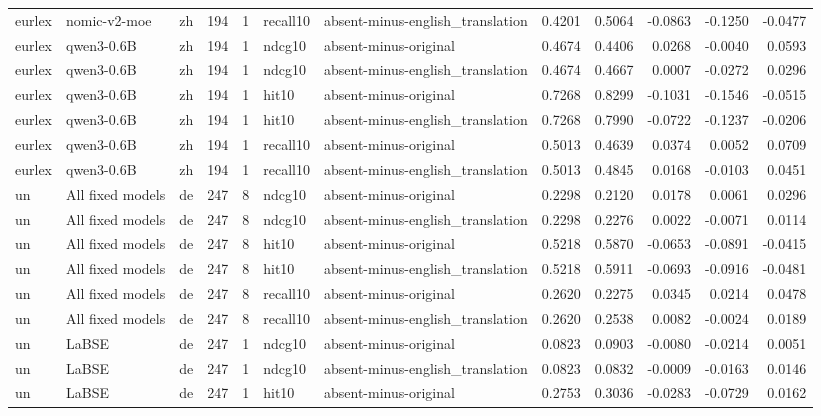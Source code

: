 \begin{tabular}{lllrrllrrrrr}
eurlex & nomic-v2-moe & zh & 194 & 1 & recall10 & absent-minus-english\_translation & 0.4201 & 0.5064 & -0.0863 & -0.1250 & -0.0477 \\
eurlex & qwen3-0.6B & zh & 194 & 1 & ndcg10 & absent-minus-original & 0.4674 & 0.4406 & 0.0268 & -0.0040 & 0.0593 \\
eurlex & qwen3-0.6B & zh & 194 & 1 & ndcg10 & absent-minus-english\_translation & 0.4674 & 0.4667 & 0.0007 & -0.0272 & 0.0296 \\
eurlex & qwen3-0.6B & zh & 194 & 1 & hit10 & absent-minus-original & 0.7268 & 0.8299 & -0.1031 & -0.1546 & -0.0515 \\
eurlex & qwen3-0.6B & zh & 194 & 1 & hit10 & absent-minus-english\_translation & 0.7268 & 0.7990 & -0.0722 & -0.1237 & -0.0206 \\
eurlex & qwen3-0.6B & zh & 194 & 1 & recall10 & absent-minus-original & 0.5013 & 0.4639 & 0.0374 & 0.0052 & 0.0709 \\
eurlex & qwen3-0.6B & zh & 194 & 1 & recall10 & absent-minus-english\_translation & 0.5013 & 0.4845 & 0.0168 & -0.0103 & 0.0451 \\
un & All fixed models & de & 247 & 8 & ndcg10 & absent-minus-original & 0.2298 & 0.2120 & 0.0178 & 0.0061 & 0.0296 \\
un & All fixed models & de & 247 & 8 & ndcg10 & absent-minus-english\_translation & 0.2298 & 0.2276 & 0.0022 & -0.0071 & 0.0114 \\
un & All fixed models & de & 247 & 8 & hit10 & absent-minus-original & 0.5218 & 0.5870 & -0.0653 & -0.0891 & -0.0415 \\
un & All fixed models & de & 247 & 8 & hit10 & absent-minus-english\_translation & 0.5218 & 0.5911 & -0.0693 & -0.0916 & -0.0481 \\
un & All fixed models & de & 247 & 8 & recall10 & absent-minus-original & 0.2620 & 0.2275 & 0.0345 & 0.0214 & 0.0478 \\
un & All fixed models & de & 247 & 8 & recall10 & absent-minus-english\_translation & 0.2620 & 0.2538 & 0.0082 & -0.0024 & 0.0189 \\
un & LaBSE & de & 247 & 1 & ndcg10 & absent-minus-original & 0.0823 & 0.0903 & -0.0080 & -0.0214 & 0.0051 \\
un & LaBSE & de & 247 & 1 & ndcg10 & absent-minus-english\_translation & 0.0823 & 0.0832 & -0.0009 & -0.0163 & 0.0146 \\
un & LaBSE & de & 247 & 1 & hit10 & absent-minus-original & 0.2753 & 0.3036 & -0.0283 & -0.0729 & 0.0162 \\

\end{tabular}
